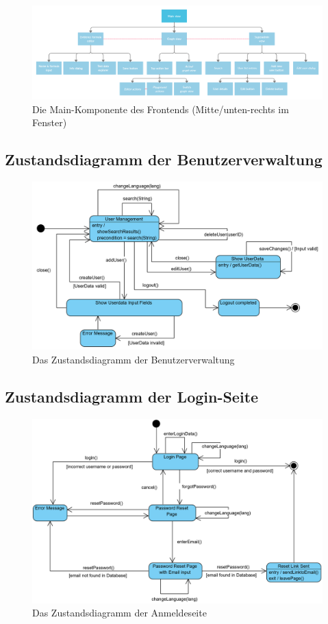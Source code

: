 \documentclass{article}
\begin{document}
\begin{figure}[ht!]
    \includegraphics[width=\linewidth]{image/Component_Main.png}
     \caption{Die Main-Komponente des Frontends (Mitte/unten-rechts im Fenster)}
\end{figure}
\newpage
\subsection{Zustandsdiagramm der Benutzerverwaltung}
\begin{figure}[ht!]
    \includegraphics[width=\linewidth]{image/Benutzerverwaltung.png}
    \caption{Das Zustandsdiagramm der Benutzerverwaltung}
\end{figure}
\newpage
\subsection{Zustandsdiagramm der Login-Seite}
\begin{figure}[ht!]
    \includegraphics[width=\linewidth]{image/Anmeldeseite.png}
    \caption{Das Zustandsdiagramm der Anmeldeseite}
\end{figure}
\end{document}
